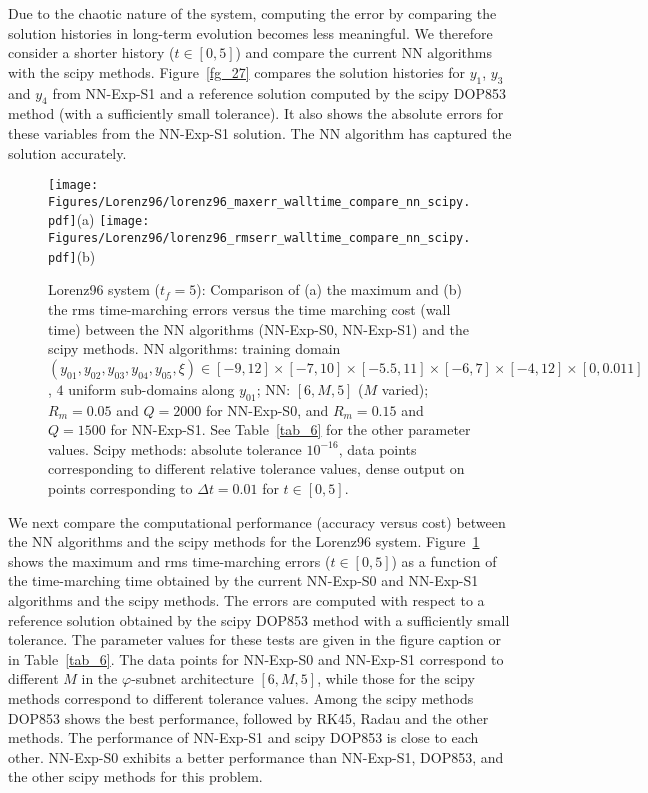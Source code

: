 Due to the chaotic nature of the system, computing the error by comparing
the solution histories in long-term evolution becomes less meaningful.
We therefore consider a shorter history ($t\in[0,5]$) and compare
the current NN algorithms with the scipy methods.
Figure~\ref{fg_27} compares the solution histories for $y_1$, $y_3$ and $y_4$
from NN-Exp-S1 and  a reference solution computed by the scipy
DOP853 method (with a sufficiently small tolerance). It also shows
the absolute errors for these variables from the NN-Exp-S1 solution.
The NN algorithm has  captured the solution accurately.



\begin{figure}
  \centerline{
    \texttt{[image: Figures/Lorenz96/lorenz96\_maxerr\_walltime\_compare\_nn\_scipy.pdf]}(a)
    \texttt{[image: Figures/Lorenz96/lorenz96\_rmserr\_walltime\_compare\_nn\_scipy.pdf]}(b)
  }
  \caption{Lorenz96 system ($t_f=5$): Comparison of (a) the maximum
    and (b) the rms time-marching errors versus the time marching cost (wall time)
    between the NN algorithms (NN-Exp-S0, NN-Exp-S1) and the scipy methods.
    NN algorithms: training domain $(y_{01},y_{02},y_{03},y_{04},y_{05},\xi)\in[-9,12]\times[-7,10]\times[-5.5,11]\times[-6,7]\times[-4,12]\times[0,0.011]$, $4$ uniform sub-domains
    along $y_{01}$;
    NN: $[6,M,5]$ ($M$ varied);
    $R_m=0.05$ and $Q=2000$ for NN-Exp-S0, and $R_m=0.15$ and $Q=1500$ for NN-Exp-S1.
    See Table~\ref{tab_6} for the other parameter values.
    Scipy methods: 
    absolute tolerance $10^{-16}$, data points corresponding to different relative tolerance
    values, dense output on points corresponding to
    $\Delta t=0.01$ for $t\in[0,5]$.
  }
  \label{fg_28}
\end{figure}

We next compare the computational performance (accuracy versus cost)
between the NN algorithms and
the scipy methods for the Lorenz96 system.
Figure~\ref{fg_28} shows the maximum and rms time-marching errors
($t\in[0,5]$) as a function of the time-marching time
obtained by the current NN-Exp-S0 and NN-Exp-S1 algorithms
and the scipy methods. The errors are computed with respect to a reference
solution obtained by the scipy DOP853 method with a sufficiently small
tolerance. The parameter values for these tests are given in
the figure caption or in Table~\ref{tab_6}.
The data points for NN-Exp-S0 and NN-Exp-S1 correspond to different
$M$ in the $\varphi$-subnet architecture $[6,M,5]$, while those for
the scipy methods correspond to different tolerance values.
Among the scipy methods DOP853 shows the best performance, followed by RK45,
Radau and the other methods.  The performance of NN-Exp-S1 and scipy
DOP853 is close to each other. NN-Exp-S0 exhibits a better performance
than NN-Exp-S1, DOP853, and the other scipy methods for this problem.


